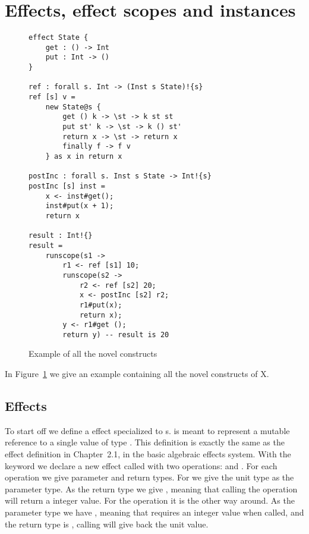 \section{Effects, effect scopes and instances}
\label{section:basics}

\begin{figure}
\caption{Example of all the novel constructs}
\begin{verbatim}
effect State {
	get : () -> Int
	put : Int -> ()
}

ref : forall s. Int -> (Inst s State)!{s}
ref [s] v =
	new State@s {
		get () k -> \st -> k st st
		put st' k -> \st -> k () st'
		return x -> \st -> return x
		finally f -> f v
	} as x in return x

postInc : forall s. Inst s State -> Int!{s}
postInc [s] inst =
	x <- inst#get();
	inst#put(x + 1);
	return x

result : Int!{}
result =
	runscope(s1 ->
		r1 <- ref [s1] 10;
		runscope(s2 ->
			r2 <- ref [s2] 20;
			x <- postInc [s2] r2;
			r1#put(x);
			return x);
		y <- r1#get ();
		return y) -- result is 20
\end{verbatim}
\label{fig:example1}
\end{figure}

In Figure~\ref{fig:example1} we give an example containing all the novel constructs of X.

\subsection{Effects}

To start off we define a  effect specialized to s.
 is meant to represent a mutable reference to a single value of type .
This definition is exactly the same as the  effect definition in Chapter~2.1, in the basic algebraic effects system.
With the  keyword we declare a new effect called  with two operations:  and .
For each operation we give parameter and return types. For  we give the unit type \ident{()} as the parameter type.
As the return type we give , meaning that calling the  operation will return a integer value.
For the  operation it is the other way around.
As the parameter type we have , meaning that  requires an integer value when called, and the return type is \ident{()}, calling  will give back the unit value.

